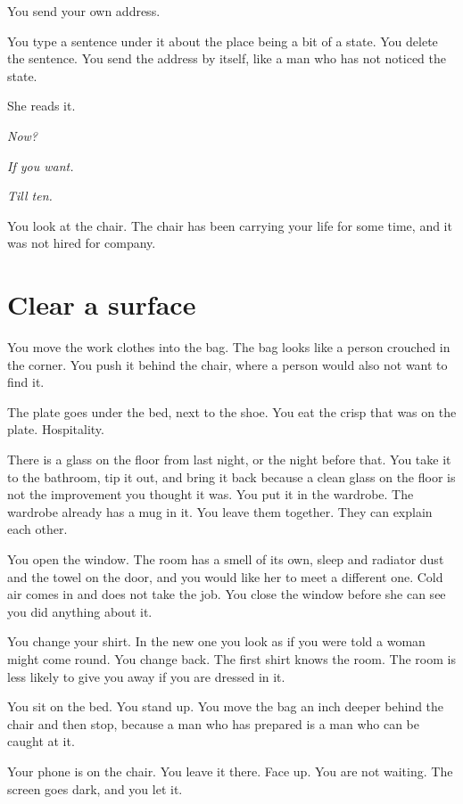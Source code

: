 \documentclass[11pt,oneside]{book}
\begin{document}
You send your own address.

You type a sentence under it about the place being a bit of a state. You delete the sentence. You send the address by itself, like a man who has not noticed the state.

She reads it.

\emph{Now?}

\emph{If you want.}

\emph{Till ten.}

You look at the chair. The chair has been carrying your life for some time, and it was not hired for company.

\section*{Clear a surface}

You move the work clothes into the bag. The bag looks like a person crouched in the corner. You push it behind the chair, where a person would also not want to find it.

The plate goes under the bed, next to the shoe. You eat the crisp that was on the plate. Hospitality.

There is a glass on the floor from last night, or the night before that. You take it to the bathroom, tip it out, and bring it back because a clean glass on the floor is not the improvement you thought it was. You put it in the wardrobe. The wardrobe already has a mug in it. You leave them together. They can explain each other.

You open the window. The room has a smell of its own, sleep and radiator dust and the towel on the door, and you would like her to meet a different one. Cold air comes in and does not take the job. You close the window before she can see you did anything about it.

You change your shirt. In the new one you look as if you were told a woman might come round. You change back. The first shirt knows the room. The room is less likely to give you away if you are dressed in it.

You sit on the bed. You stand up. You move the bag an inch deeper behind the chair and then stop, because a man who has prepared is a man who can be caught at it.

Your phone is on the chair. You leave it there. Face up. You are not waiting. The screen goes dark, and you let it.
\end{document}
